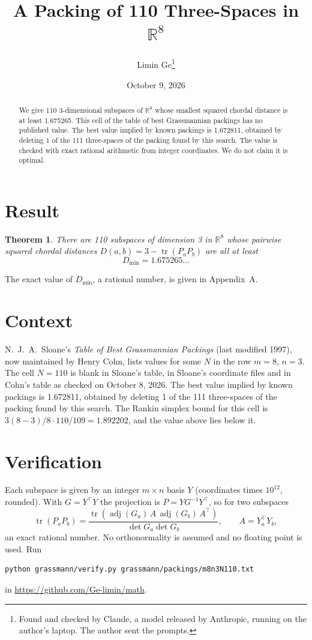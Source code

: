 \documentclass[11pt,a4paper]{article}
\title{A Packing of 110 Three-Spaces in $\mathbb{R}^{8}$}
\author{Limin Ge\thanks{Found and checked by Claude, a model released by Anthropic, running on the author's laptop. The author sent the prompts.}}
\date{October 9, 2026}
\newtheorem*{theorem}{Theorem}
\begin{document}
\maketitle
\begin{abstract}
We give 110 3-dimensional subspaces of $\mathbb{R}^{8}$ whose smallest squared chordal distance is at least 1.675265. This cell of the table of best Grassmannian packings has no published value. The best value implied by known packings is 1.672811, obtained by deleting 1 of the 111 three-spaces of the packing found by this search. The value is checked with exact rational arithmetic from integer coordinates. We do not claim it is optimal.
\end{abstract}

\section{Result}
\begin{theorem}
There are 110 subspaces of dimension 3 in $\mathbb{R}^{8}$ whose pairwise squared chordal distances $D(a,b) = 3 - \operatorname{tr}(P_aP_b)$ are all at least
\[ D_{\min} = 1.675265\ldots \]
\end{theorem}
The exact value of $D_{\min}$, a rational number, is given in Appendix~A.


\section{Context}
N.~J.~A.~Sloane's \emph{Table of Best Grassmannian Packings} (last modified 1997), now maintained by Henry Cohn, lists values for some $N$ in the row $m=8$, $n=3$. The cell $N=110$ is blank in Sloane's table, in Sloane's coordinate files and in Cohn's table as checked on October 8, 2026. The best value implied by known packings is 1.672811, obtained by deleting 1 of the 111 three-spaces of the packing found by this search. The Rankin simplex bound for this cell is $3(8-3)/8\cdot 110/109 = 1.892202$, and the value above lies below it.


\section{Verification}
Each subspace is given by an integer $m\times n$ basis $Y$ (coordinates times $10^{12}$, rounded). With $G=Y^\top Y$ the projection is $P=YG^{-1}Y^\top$, so for two subspaces
\[ \operatorname{tr}(P_aP_b)=\frac{\operatorname{tr}(\operatorname{adj}(G_a)\,A\,\operatorname{adj}(G_b)\,A^\top)}{\det G_a\det G_b},\qquad A=Y_a^\top Y_b, \]
an exact rational number. No orthonormality is assumed and no floating point is used. Run
\begin{verbatim}
python grassmann/verify.py grassmann/packings/m8n3N110.txt
\end{verbatim}
in \url{https://github.com/Ge-limin/math}.
\end{document}
